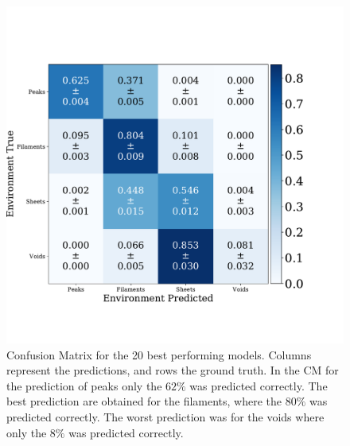 \documentclass[usenatbib]{mnras}
\begin{document}
\begin{figure}
\centering
    \includegraphics[scale=0.33]{Figs/p_confusion_matrix_20.pdf}
    \caption{Confusion Matrix for the 20 best performing models. Columns represent the predictions, and rows the ground truth. In the CM for the prediction of peaks only the $62\%$ was predicted correctly. The best prediction are obtained for the filaments, where the $80\%$ was predicted correctly. The worst prediction was for the voids where only the $8\%$ was predicted correctly.}
    \label{fig:confusion_matrix}    
\end{figure}
\end{document}
